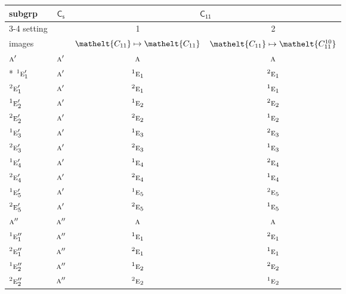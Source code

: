 \documentclass[10pt,a4paper]{article}
\numberwithin{equation}{section}
\newcommand{\eltfont}[1]{{\let\sigma\eltsigma\mathelt{#1}}}
\newcommand{\grp}[1]{\mathsf{#1}}
\newcommand{\irr}[1]{\text{\normalfont\scshape #1}}
\newcommand{\conjpair}[1]{{}^{#1}}
\newcommand{\cls}[1]{\eltfont{#1}}
\begin{document}
{\small\begin{longtable}{@{}lccc@{}}\toprule
subgrp & \href{C1v.pdf}{$\grp{C_{s}}$} & \multicolumn{2}{c}{\href{C11.pdf}{$\grp{C_{11}}$}}\\\cmidrule(lr){3-4}
setting &  & 1 & 2\\
images &  & {\scriptsize $\cls{C_{11}} \mapsto \cls{C_{11}}$} & {\scriptsize $\cls{C_{11}} \mapsto \cls{C_{11}^{10}}$}\\\midrule\endhead
\bottomrule\endfoot\endlastfoot
$\irr{a}'$ & $\irr{a}'$ & $\irr{a}$ & $\irr{a}$\\*
$\conjpair{1}\irr{e}_{1}'$ & $\irr{a}'$ & $\conjpair{1}\irr{e}_{1}$ & $\conjpair{2}\irr{e}_{1}$\\
$\conjpair{2}\irr{e}_{1}'$ & $\irr{a}'$ & $\conjpair{2}\irr{e}_{1}$ & $\conjpair{1}\irr{e}_{1}$\\
$\conjpair{1}\irr{e}_{2}'$ & $\irr{a}'$ & $\conjpair{1}\irr{e}_{2}$ & $\conjpair{2}\irr{e}_{2}$\\
$\conjpair{2}\irr{e}_{2}'$ & $\irr{a}'$ & $\conjpair{2}\irr{e}_{2}$ & $\conjpair{1}\irr{e}_{2}$\\
$\conjpair{1}\irr{e}_{3}'$ & $\irr{a}'$ & $\conjpair{1}\irr{e}_{3}$ & $\conjpair{2}\irr{e}_{3}$\\
$\conjpair{2}\irr{e}_{3}'$ & $\irr{a}'$ & $\conjpair{2}\irr{e}_{3}$ & $\conjpair{1}\irr{e}_{3}$\\
$\conjpair{1}\irr{e}_{4}'$ & $\irr{a}'$ & $\conjpair{1}\irr{e}_{4}$ & $\conjpair{2}\irr{e}_{4}$\\
$\conjpair{2}\irr{e}_{4}'$ & $\irr{a}'$ & $\conjpair{2}\irr{e}_{4}$ & $\conjpair{1}\irr{e}_{4}$\\
$\conjpair{1}\irr{e}_{5}'$ & $\irr{a}'$ & $\conjpair{1}\irr{e}_{5}$ & $\conjpair{2}\irr{e}_{5}$\\
$\conjpair{2}\irr{e}_{5}'$ & $\irr{a}'$ & $\conjpair{2}\irr{e}_{5}$ & $\conjpair{1}\irr{e}_{5}$\\
$\irr{a}''$ & $\irr{a}''$ & $\irr{a}$ & $\irr{a}$\\
$\conjpair{1}\irr{e}_{1}''$ & $\irr{a}''$ & $\conjpair{1}\irr{e}_{1}$ & $\conjpair{2}\irr{e}_{1}$\\
$\conjpair{2}\irr{e}_{1}''$ & $\irr{a}''$ & $\conjpair{2}\irr{e}_{1}$ & $\conjpair{1}\irr{e}_{1}$\\
$\conjpair{1}\irr{e}_{2}''$ & $\irr{a}''$ & $\conjpair{1}\irr{e}_{2}$ & $\conjpair{2}\irr{e}_{2}$\\
$\conjpair{2}\irr{e}_{2}''$ & $\irr{a}''$ & $\conjpair{2}\irr{e}_{2}$ & $\conjpair{1}\irr{e}_{2}$\\

\end{longtable}}
\end{document}
